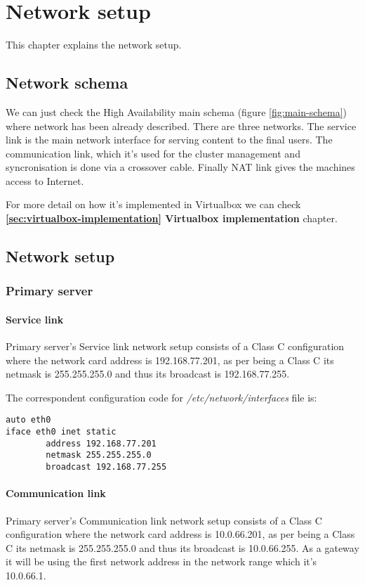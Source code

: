 

\chapter{Network setup}
\label{chap:network-setup}
This chapter explains the network setup.

\section {Network schema}
We can just check the High Availability main schema (figure \ref{fig:main-schema}) where network has been already described. There are three networks. The service link is the main network interface for serving content to the final users. The communication link, which it's used for the cluster management and syncronisation is done via a crossover cable. Finally NAT link gives the machines access to Internet.

For more detail on how it's implemented in Virtualbox we can check \textbf{\ref{sec:virtualbox-implementation} Virtualbox implementation} chapter.

\section {Network setup}

\subsection {Primary server}
\subsubsection {Service link}
Primary server's Service link network setup consists of a Class C configuration where the network card address is 192.168.77.201, as per being a Class C its netmask is 255.255.255.0 and thus its broadcast is 192.168.77.255.

The correspondent configuration code for \textit{/etc/network/interfaces} file is:
\begin{verbatim}
auto eth0
iface eth0 inet static
        address 192.168.77.201
        netmask 255.255.255.0
        broadcast 192.168.77.255
\end{verbatim}

\subsubsection {Communication link}
Primary server's Communication link network setup consists of a Class C configuration where the network card address is 10.0.66.201, as per being a Class C its netmask is 255.255.255.0 and thus its broadcast is 10.0.66.255. As a gateway it will be using the first network address in the network range which it's 10.0.66.1.


